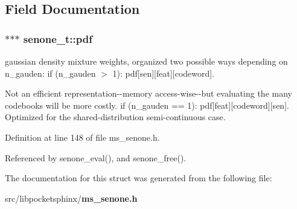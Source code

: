\subsection{\-Field \-Documentation}
\subsubsection[{pdf}]{$\ast$$\ast$$\ast$ {\bf senone\-\_\-t\-::pdf}}\label{structsenone__t_aa7e23dc8a18875bad1c1b9c322f3cad4}


gaussian density mixture weights, organized two possible ways depending on n\-\_\-gauden\-: if (n\-\_\-gauden $>$ 1)\-: pdf[sen][feat][codeword]. 

\-Not an efficient representation-\/-\/memory access-\/wise-\/-\/but evaluating the many codebooks will be more costly. if (n\-\_\-gauden == 1)\-: pdf[feat][codeword][sen]. \-Optimized for the shared-\/distribution semi-\/continuous case. 

\-Definition at line 148 of file ms\-\_\-senone.\-h.



\-Referenced by senone\-\_\-eval(), and senone\-\_\-free().



\-The documentation for this struct was generated from the following file\-:\begin{DoxyCompactItemize}
\item 
src/libpocketsphinx/{\bf ms\-\_\-senone.\-h}\end{DoxyCompactItemize}
